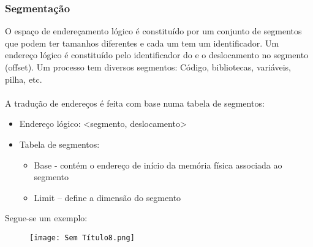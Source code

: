 \documentclass[10pt,a4paper]{report}
\begin{document}
\subsubsection{Segmentação}
O espaço de endereçamento lógico é constituído por um conjunto de segmentos que podem ter tamanhos diferentes e cada um tem um identificador. Um endereço lógico é constituído pelo identificador do e o deslocamento no segmento (offset). Um processo tem diversos segmentos: Código, bibliotecas, variáveis, pilha, etc.\\
\\
A tradução de endereços é feita com base numa tabela de segmentos:
\begin{itemize}
\item Endereço lógico: <segmento, deslocamento>
\item Tabela de segmentos:
\begin{itemize}
\item Base - contém o endereço de início da memória física associada ao segmento
\item Limit – define a dimensão do segmento
\end{itemize}
\end{itemize}
Segue-se um exemplo:
\begin{figure}[H]
\centering
\texttt{[image: Sem Título8.png]}
\end{figure}
\end{document}
